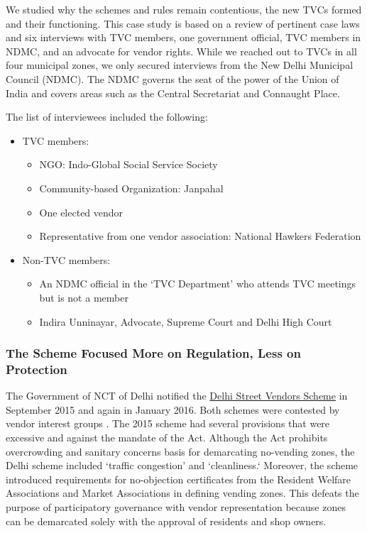 \documentclass[a4paper, 12pt, twoside]{article}
\begin{document}
{{We studied why the schemes and rules remain contentious, the new TVCs formed and their functioning. This case study is based on a review of pertinent case laws and six interviews with TVC members, one government official, TVC members in NDMC, and an advocate for vendor rights. While we reached out to TVCs in all four municipal zones, we only secured interviews from the New Delhi Municipal Council (NDMC). The NDMC governs the seat of the power of the Union of India and covers areas such as the Central Secretariat and Connaught Place. 

The list of interviewees included the following:
\begin{itemize}[nosep]
\item TVC members:
\begin{itemize}
\item NGO: Indo-Global Social Service Society
\item Community-based Organization: Janpahal
\item One elected vendor

\item Representative from one vendor association: National Hawkers Federation
\end{itemize}
\item Non-TVC members:
\begin{itemize}
\item An NDMC official in the `TVC Department' who attends TVC meetings but is not a member
\item Indira Unninayar, Advocate, Supreme Court and Delhi High Court
\end{itemize}
\end{itemize}

\subsubsection*{The Scheme Focused More on Regulation, Less on Protection}

The Government of NCT of Delhi notified the \href{http://mohua.gov.in/upload/uploadfiles/files/6(2).pdf}{Delhi Street Vendors Scheme} in September 2015 and again in January 2016. Both schemes were contested by vendor interest groups \parencite{tirkeynews}. The 2015 scheme had several provisions that were excessive and against the mandate of the Act. Although the Act prohibits overcrowding and sanitary concerns basis for demarcating no-vending zones, the Delhi scheme included `traffic congestion' and `cleanliness.` Moreover, the scheme introduced requirements for no-objection certificates from the Resident Welfare Associations and Market Associations in defining vending zones. This defeats the purpose of participatory governance with vendor representation because zones can be demarcated solely with the approval of residents and shop owners. 

}}
\end{document}
